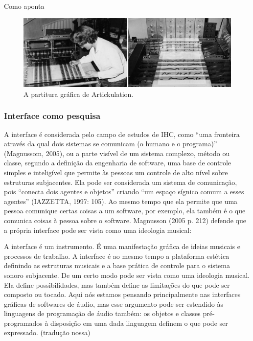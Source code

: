 Como aponta 


\begin{figure}[ht]
    \caption{\label{ligeti}A partitura gráfica de Artickulation.}
    \begin{center}
        \includegraphics[width=1\linewidth]{pictures/cap2/oramics}
    \end{center}
\end{figure}


\subsubsection{Interface como pesquisa}
A interface é considerada pelo campo de estudos de IHC, como “uma fronteira através da qual dois sistemas se comunicam (o humano e o programa)” (Magnussom, 2005), ou a parte visível de um sistema complexo, método ou classe, segundo a definição da engenharia de software, uma base de controle simples e inteligível que permite às pessoas um controle de alto nível sobre estruturas subjacentes. Ela pode ser considerada um sistema de comunicação, pois “conecta dois agentes e objetos” criando “um espaço sígnico comum a esses agentes” (IAZZETTA, 1997: 105). Ao mesmo tempo que ela permite que uma pessoa comunique certas coisas a um software, por exemplo, ela também é o que comunica coisas à pessoa sobre o software. Magnusson (2005 p. 212) defende que a própria interface pode ser vista como uma ideologia musical: 

\begin{citacao}
A interface é um instrumento. É uma manifestação gráfica de ideias musicais e processos de trabalho. A interface é ao mesmo tempo a plataforma estética definindo as estruturas musicais e a base prática de controle para o sistema sonoro subjacente. De um certo modo pode ser vista como uma ideologia musical. Ela define possibilidades, mas também define as limitações do que pode ser composto ou tocado. Aqui nós estamos pensando principalmente nas interfaces gráficas de softwares de áudio, mas esse argumento pode ser estendido às linguagens de programação de áudio também: os objetos e classes pré-programados à disposição em uma dada linguagem definem o que pode ser expressado. (tradução nossa)
\end{citacao}

